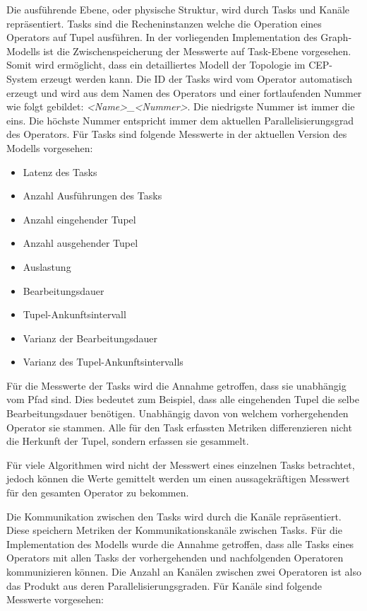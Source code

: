 Die ausführende Ebene, oder physische Struktur, wird durch Tasks und Kanäle repräsentiert.
Tasks sind die Recheninstanzen welche die Operation eines Operators auf Tupel ausführen.
In der vorliegenden Implementation des Graph-Modells ist die Zwischenspeicherung der Messwerte auf Task-Ebene vorgesehen.
Somit wird ermöglicht, dass ein detailliertes Modell der Topologie im CEP-System erzeugt werden kann.
Die ID der Tasks wird vom Operator automatisch erzeugt und wird aus dem Namen des Operators und einer fortlaufenden Nummer wie folgt gebildet: \textit{<Name>\_<Nummer>}.
Die niedrigste Nummer ist immer die eins.
Die höchste Nummer entspricht immer dem aktuellen Parallelisierungsgrad des Operators.
Für Tasks sind folgende Messwerte in der aktuellen Version des Modells vorgesehen:

\begin{itemize}
\item{Latenz des Tasks}
\item{Anzahl Ausführungen des Tasks}
\item{Anzahl eingehender Tupel}
\item{Anzahl ausgehender Tupel}
\item{Auslastung}
\item{Bearbeitungsdauer}
\item{Tupel-Ankunftsintervall}
\item{Varianz der Bearbeitungsdauer}
\item{Varianz des Tupel-Ankunftsintervalls}
\end{itemize}

Für die Messwerte der Tasks wird die Annahme getroffen, dass sie unabhängig vom Pfad sind.
Dies bedeutet zum Beispiel, dass alle eingehenden Tupel die selbe Bearbeitungsdauer benötigen.
Unabhängig davon von welchem vorhergehenden Operator sie stammen.
Alle für den Task erfassten Metriken differenzieren nicht die Herkunft der Tupel, sondern erfassen sie gesammelt.

Für viele Algorithmen wird nicht der Messwert eines einzelnen Tasks betrachtet, jedoch können die Werte gemittelt werden um einen aussagekräftigen Messwert für den gesamten Operator zu bekommen.

Die Kommunikation zwischen den Tasks wird durch die Kanäle repräsentiert.
Diese speichern Metriken der Kommunikationskanäle zwischen Tasks.
Für die Implementation des Modells wurde die Annahme getroffen, dass alle Tasks eines Operators mit allen Tasks der vorhergehenden und nachfolgenden Operatoren kommunizieren können.
Die Anzahl an Kanälen zwischen zwei Operatoren ist also das Produkt aus deren Parallelisierungsgraden.
Für Kanäle sind folgende Messwerte vorgesehen:

